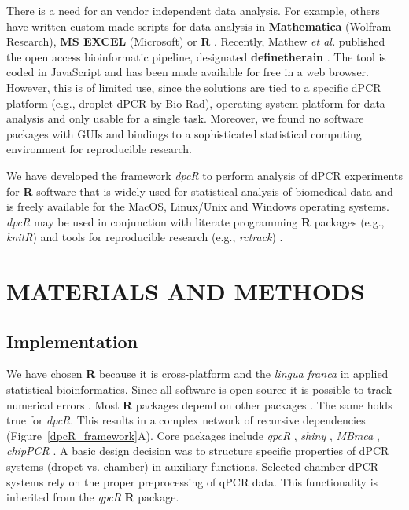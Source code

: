\documentclass[a4,center,fleqn]{NAR}
\begin{document}
There is a need for an vendor independent data analysis. For example, others 
have written custom made scripts for data analysis in \textbf{Mathematica} 
(Wolfram Research), \textbf{MS EXCEL} (Microsoft) or \textbf{R} 
\cite{strain_highly_2013, dreo_optimising_2014, trypsteen_ddpcrquant_2015, 
dobnik_multiplex_2015}. Recently, Mathew \textit{et al.} published the open 
access bioinformatic pipeline, designated \textbf{definetherain} 
\cite{jones_low_2014}. The tool is coded in JavaScript and has been made 
available for free in a web browser. However, this is of limited use, since the 
solutions are tied to a specific dPCR platform (e.g., droplet dPCR by Bio-Rad), 
operating system platform for data analysis and only usable for a single task. 
Moreover, we found no software packages with GUIs and bindings to a 
sophisticated statistical computing environment for reproducible research. 

We have developed the framework \textit{dpcR} to perform analysis of dPCR 
experiments for \textbf{R} software that is widely used for statistical analysis 
of biomedical data and is freely available for the MacOS, Linux/Unix and Windows 
operating systems. \textit{dpcR}  may be used in conjunction with literate 
programming \textbf{R} packages (e.g., \textit{knitR}) and tools for 
reproducible research (e.g.,  \textit{rctrack}) \cite{liu_r_2014, rodiger_r_2015}. 

\section{MATERIALS AND METHODS}

\subsection{Implementation}

We have chosen \textbf{R} because it is cross-platform and the \textit{lingua 
franca} in applied statistical bioinformatics. Since all software is open source 
it is possible to track numerical errors \cite{rodiger_rkward_2012, 
rodiger_r_2015}. Most \textbf{R} packages depend on other packages 
\cite{ooms_2013}. The same holds true for \textit{dpcR}. This results in a 
complex network of recursive dependencies (Figure~\ref{dpcR_framework}A). Core 
packages include \textit{qpcR} \cite{ritz_qpcr_2008}, \textit{shiny} 
\cite{shiny}, \textit{MBmca} \cite{rodiger_surface_2013}, \textit{chipPCR} 
\cite{roediger2015chippcr}. A basic design decision was to structure specific 
properties of dPCR systems (dropet vs. chamber) in auxiliary functions. Selected 
chamber dPCR systems rely on the proper preprocessing of qPCR data. This 
functionality is inherited from the \textit{qpcR} \textbf{R} package.
\end{document}

